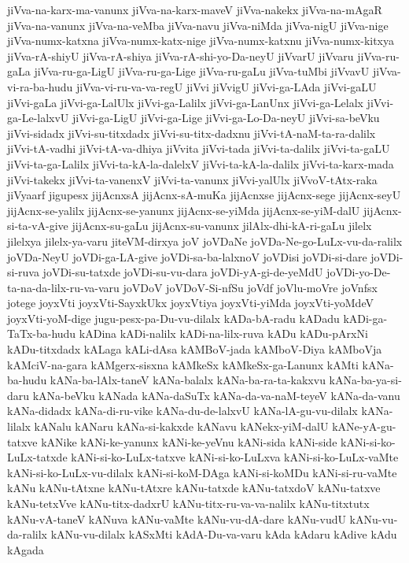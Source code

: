 {jiVva-na-karx-ma-vanunx
jiVva-na-karx-maveV
jiVva-nakekx
jiVva-na-mAgaR
jiVva-na-vanunx
jiVva-na-veMba
jiVva-navu
jiVva-niMda
jiVva-nigU
jiVva-nige
jiVva-numx-katxna
jiVva-numx-katx-nige
jiVva-numx-katxnu
jiVva-numx-kitxya
jiVva-rA-shiyU
jiVva-rA-shiya
jiVva-rA-shi-yo-Da-neyU
jiVvarU
jiVvaru
jiVva-ru-gaLa
jiVva-ru-ga-LigU
jiVva-ru-ga-Lige
jiVva-ru-gaLu
jiVva-tuMbi
jiVvavU
jiVva-vi-ra-ba-hudu
jiVva-vi-ru-va-va-regU
jiVvi
jiVvigU
jiVvi-ga-LAda
jiVvi-gaLU
jiVvi-gaLa
jiVvi-ga-LalUlx
jiVvi-ga-Lalilx
jiVvi-ga-LanUnx
jiVvi-ga-Lelalx
jiVvi-ga-Le-lalxvU
jiVvi-ga-LigU
jiVvi-ga-Lige
jiVvi-ga-Lo-Da-neyU
jiVvi-sa-beVku
jiVvi-sidadx
jiVvi-su-titxdadx
jiVvi-su-titx-dadxnu
jiVvi-tA-naM-ta-ra-dalilx
jiVvi-tA-vadhi
jiVvi-tA-va-dhiya
jiVvita
jiVvi-tada
jiVvi-ta-dalilx
jiVvi-ta-gaLU
jiVvi-ta-ga-Lalilx
jiVvi-ta-kA-la-dalelxV
jiVvi-ta-kA-la-dalilx
jiVvi-ta-karx-mada
jiVvi-takekx
jiVvi-ta-vanenxV
jiVvi-ta-vanunx
jiVvi-yalUlx
jiVvoV-tAtx-raka
jiVyaarf
jigupesx
jijAcnxsA
jijAcnx-sA-muKa
jijAcnxse
jijAcnx-sege
jijAcnx-seyU
jijAcnx-se-yalilx
jijAcnx-se-yanunx
jijAcnx-se-yiMda
jijAcnx-se-yiM-dalU
jijAcnx-si-ta-vA-give
jijAcnx-su-gaLu
jijAcnx-su-vanunx
jilAlx-dhi-kA-ri-gaLu
jilelx
jilelxya
jilelx-ya-varu
jiteVM-dirxya
joV
joVDaNe
joVDa-Ne-go-LuLx-vu-da-ralilx
joVDa-NeyU
joVDi-ga-LA-give
joVDi-sa-ba-lalxnoV
joVDisi
joVDi-si-dare
joVDi-si-ruva
joVDi-su-tatxde
joVDi-su-vu-dara
joVDi-yA-gi-de-yeMdU
joVDi-yo-De-ta-na-da-lilx-ru-va-varu
joVDoV
joVDoV-Si-nfSu
joVdf
joVlu-moVre
joVnfsx
jotege
joyxVti
joyxVti-SayxkUkx
joyxVtiya
joyxVti-yiMda
joyxVti-yoMdeV
joyxVti-yoM-dige
jugu-pesx-pa-Du-vu-dilalx
kADa-bA-radu
kADadu
kADi-ga-TaTx-ba-hudu
kADina
kADi-nalilx
kADi-na-lilx-ruva
kADu
kADu-pArxNi
kADu-titxdadx
kALaga
kALi-dAsa
kAMBoV-jada
kAMboV-Diya
kAMboVja
kAMciV-na-gara
kAMgerx-sisxna
kAMkeSx
kAMkeSx-ga-Lanunx
kAMti
kANa-ba-hudu
kANa-ba-lAlx-taneV
kANa-balalx
kANa-ba-ra-ta-kakxvu
kANa-ba-ya-si-daru
kANa-beVku
kANada
kANa-daSuTx
kANa-da-va-naM-teyeV
kANa-da-vanu
kANa-didadx
kANa-di-ru-vike
kANa-du-de-lalxvU
kANa-lA-gu-vu-dilalx
kANa-lilalx
kANalu
kANaru
kANa-si-kakxde
kANavu
kANekx-yiM-dalU
kANe-yA-gu-tatxve
kANike
kANi-ke-yanunx
kANi-ke-yeVnu
kANi-sida
kANi-side
kANi-si-ko-LuLx-tatxde
kANi-si-ko-LuLx-tatxve
kANi-si-ko-LuLxva
kANi-si-ko-LuLx-vaMte
kANi-si-ko-LuLx-vu-dilalx
kANi-si-koM-DAga
kANi-si-koMDu
kANi-si-ru-vaMte
kANu
kANu-tAtxne
kANu-tAtxre
kANu-tatxde
kANu-tatxdoV
kANu-tatxve
kANu-tetxVve
kANu-titx-dadxrU
kANu-titx-ru-va-va-nalilx
kANu-titxtutx
kANu-vA-taneV
kANuva
kANu-vaMte
kANu-vu-dA-dare
kANu-vudU
kANu-vu-da-ralilx
kANu-vu-dilalx
kASxMti
kAdA-Du-va-varu
kAda
kAdaru
kAdive
kAdu
kAgada
}
